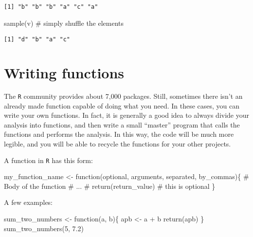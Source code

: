 \documentclass[
  letterpaper,
  DIV=11,
  numbers=noendperiod]{scrreprt}
\newenvironment{Shaded}{\begin{snugshade}}{\end{snugshade}}
\newcommand{\CommentTok}[1]{\textcolor[rgb]{0.37,0.37,0.37}{#1}}
\newcommand{\ControlFlowTok}[1]{\textcolor[rgb]{0.00,0.23,0.31}{#1}}
\newcommand{\DecValTok}[1]{\textcolor[rgb]{0.68,0.00,0.00}{#1}}
\newcommand{\FloatTok}[1]{\textcolor[rgb]{0.68,0.00,0.00}{#1}}
\newcommand{\FunctionTok}[1]{\textcolor[rgb]{0.28,0.35,0.67}{#1}}
\newcommand{\NormalTok}[1]{\textcolor[rgb]{0.00,0.23,0.31}{#1}}
\newcommand{\OtherTok}[1]{\textcolor[rgb]{0.00,0.23,0.31}{#1}}
\newcommand{\SpecialCharTok}[1]{\textcolor[rgb]{0.37,0.37,0.37}{#1}}
\begin{document}
\begin{verbatim}
[1] "b" "b" "b" "a" "c" "a"
\end{verbatim}

\begin{Shaded}
\begin{Highlighting}[]
\FunctionTok{sample}\NormalTok{(v) }\CommentTok{\# simply shuffle the elements}
\end{Highlighting}
\end{Shaded}

\begin{verbatim}
[1] "d" "b" "a" "c"
\end{verbatim}

\hypertarget{writing-functions}{%
\section{Writing functions}\label{writing-functions}}

The \texttt{R} community provides about 7,000 packages. Still, sometimes
there isn't an already made function capable of doing what you need. In
these cases, you can write your own functions. In fact, it is generally
a good idea to always divide your analysis into functions, and then
write a small ``master'' program that calls the functions and performs
the analysis. In this way, the code will be much more legible, and you
will be able to recycle the functions for your other projects.

A function in \texttt{R} has this form:

\begin{Shaded}
\begin{Highlighting}[]
\NormalTok{my\_function\_name }\OtherTok{\textless{}{-}} \ControlFlowTok{function}\NormalTok{(optional, arguments, separated, by\_commas)\{}
  \CommentTok{\# Body of the function}
  \CommentTok{\# ...}
  \CommentTok{\# }
  \FunctionTok{return}\NormalTok{(return\_value) }\CommentTok{\# this is optional}
\NormalTok{\}}
\end{Highlighting}
\end{Shaded}

A few examples:

\begin{Shaded}
\begin{Highlighting}[]
\NormalTok{sum\_two\_numbers }\OtherTok{\textless{}{-}} \ControlFlowTok{function}\NormalTok{(a, b)\{}
\NormalTok{  apb }\OtherTok{\textless{}{-}}\NormalTok{ a }\SpecialCharTok{+}\NormalTok{ b  }
  \FunctionTok{return}\NormalTok{(apb)}
\NormalTok{\}}
\FunctionTok{sum\_two\_numbers}\NormalTok{(}\DecValTok{5}\NormalTok{, }\FloatTok{7.2}\NormalTok{)}
\end{Highlighting}
\end{Shaded}
\end{document}
